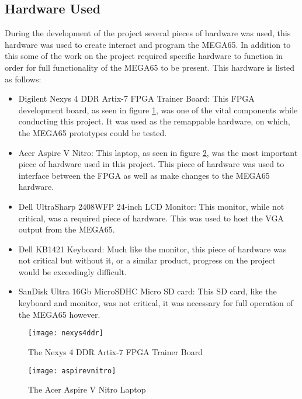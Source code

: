 \label{Ch3 Sec2}

\subsection{Hardware Used}

\label{Ch3 Sec2 Sub1}

During the development of the project several pieces of hardware was used, this hardware was used to create interact and program the MEGA65. In addition to this some of the work on the project required specific hardware to function in order for full functionality of the MEGA65 to be present. This hardware is listed as follows:\\

\begin{itemize}
\item{Digilent Nexys 4 DDR Artix-7 FPGA Trainer Board: This FPGA development board, as seen in figure \ref{fig:nexys4ddr}, was one of the vital components while conducting this project. It was used as the remappable hardware, on which, the MEGA65 prototypes could be tested.}
\item{Acer Aspire V Nitro: This laptop, as seen in figure \ref{fig:aspirevnitro}, was the most important piece of hardware used in this project. This piece of hardware was used to interface between the FPGA as well as make changes to the MEGA65 hardware.}
\item{Dell UltraSharp 2408WFP 24-inch LCD Monitor: This monitor, while not critical, was a required piece of hardware. This was used to host the VGA output from the MEGA65.}
\item{Dell KB1421 Keyboard: Much like the monitor, this piece of hardware was not critical but without it, or a similar product, progress on the project would be exceedingly difficult.}
\item{SanDisk Ultra 16Gb MicroSDHC Micro SD card: This SD card, like the keyboard and monitor, was not critical, it was necessary for full operation of the MEGA65 however.}
\end{itemize}

\begin{figure}
  \centering
  \texttt{[image: nexys4ddr]}
  \caption{The Nexys 4 DDR Artix-7 FPGA Trainer Board}
  \label{fig:nexys4ddr}
\end{figure}

\begin{figure}
  \centering
  \texttt{[image: aspirevnitro]}
  \caption{The Acer Aspire V Nitro Laptop}
  \label{fig:aspirevnitro}
\end{figure}


